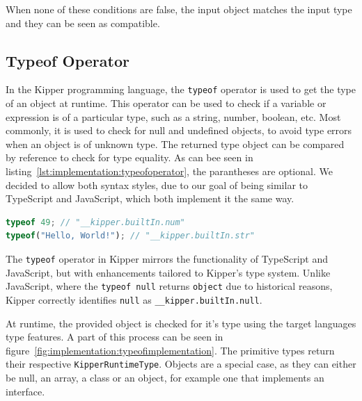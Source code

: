 When none of these conditions are false, the input object matches the input type and they can be seen as compatible.

\subsection{Typeof Operator}
\label{subsec:typeof}

In the Kipper programming language, the \lstinline|typeof| operator is used to get the type of an object at runtime. This operator can be used to check if a variable or expression is of a particular type, such as a string, number, boolean, etc. Most commonly, it is used to check for null and undefined objects, to avoid type errors when an object is of unknown type. The returned type object can be compared by reference to check for type equality. As can bee seen in listing~\ref{lst:implementation:typeofoperator}, the parantheses are optional. We decided to allow both syntax styles, due to our goal of being similar to TypeScript and JavaScript, which both implement it the same way.

\begin{lstlisting}[language=Typescript,caption=Typeof operator used to determine the type of an input expression,label=lst:implementation:typeofoperator]
typeof 49; // "__kipper.builtIn.num"
typeof("Hello, World!"); // "__kipper.builtIn.str"
\end{lstlisting}

The  \lstinline|typeof| operator in Kipper mirrors the functionality of TypeScript and JavaScript, but with enhancements tailored to Kipper's type system. Unlike JavaScript, where the  \lstinline|typeof null| returns \lstinline|object| due to historical reasons, Kipper correctly identifies  \lstinline|null| as  \lstinline|__kipper.builtIn.null|.

At runtime, the provided object is checked for it's type using the target languages type features. A part of this process can be seen in figure~\ref{fig:implementation:typeofimplementation}. The primitive types return their respective \lstinline|KipperRuntimeType|. Objects are a special case, as they can either be null, an array, a class or an object, for example one that implements an interface.

